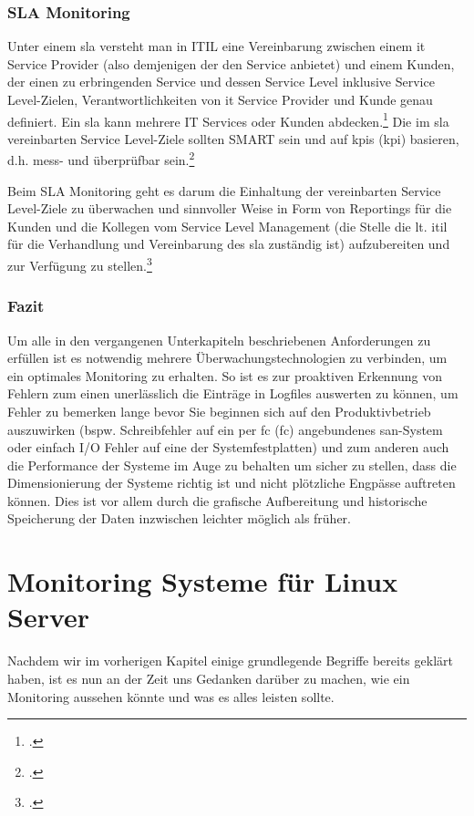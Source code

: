 \documentclass[12pt,a4paper,parskip,listof=totoc,bibliography=totoc]{scrreprt}
\begin{document}
	\subsection{SLA Monitoring}
	Unter einem \acrfull{sla} versteht man in ITIL eine \glqq Vereinbarung zwischen einem \acrshort{it} Service Provider (also demjenigen der den Service anbietet) und einem Kunden, der einen zu erbringenden Service und dessen Service Level inklusive Service Level-Zielen, Verantwortlichkeiten von \acrshort{it} Service Provider und Kunde genau definiert. Ein \acrshort{sla} kann mehrere IT Services oder Kunden abdecken.\grqq \footcite[S. 732; Stichwort: Service Level Agreement]{ebelitilv3} Die im \acrshort{sla} vereinbarten Service Level-Ziele sollten SMART sein und auf \acrshort{kpi}s (\acrlong{kpi}) basieren, d.h. mess- und überprüfbar sein.\footcite[S. 733; Stichwort: Service Level-Ziele]{ebelitilv3}
	
	Beim SLA Monitoring geht es darum die Einhaltung der vereinbarten Service Level-Ziele zu überwachen und sinnvoller Weise in Form von Reportings für die Kunden und die Kollegen vom Service Level Management (die Stelle die lt. \acrshort{itil} für die Verhandlung und Vereinbarung des \acrshort{sla} zuständig ist) aufzubereiten und zur Verfügung zu stellen.\footcite[40]{iso20000sla}
	\subsection{Fazit}
	Um alle in den vergangenen Unterkapiteln beschriebenen Anforderungen zu erfüllen ist es notwendig mehrere Überwachungstechnologien zu verbinden, um ein optimales Monitoring zu erhalten. So ist es zur proaktiven Erkennung von Fehlern zum einen unerlässlich die Einträge in Logfiles auswerten zu können, um Fehler zu bemerken lange bevor Sie beginnen sich auf den Produktivbetrieb auszuwirken (bspw. Schreibfehler auf ein per \acrlong{fc} (\acrshort{fc}) angebundenes \acrshort{san}-System oder einfach I/O Fehler auf eine der Systemfestplatten) und zum anderen auch die Performance der Systeme im Auge zu behalten um sicher zu stellen, dass die Dimensionierung der Systeme richtig ist und nicht plötzliche Engpässe auftreten können. Dies ist vor allem durch die grafische Aufbereitung und historische Speicherung der Daten inzwischen leichter möglich als früher. 
	\chapter{Monitoring Systeme für Linux Server}
	Nachdem wir im vorherigen Kapitel einige grundlegende Begriffe bereits geklärt haben, ist es nun an der Zeit uns Gedanken darüber zu machen, wie ein Monitoring aussehen könnte und was es alles leisten sollte. 
\end{document}
